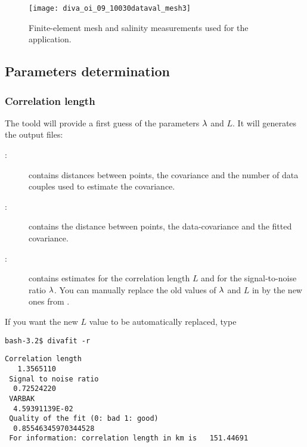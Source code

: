 \begin{figure}[h!]
\centering
\texttt{[image: diva\_oi\_09\_10030dataval\_mesh3]}
\caption{Finite-element mesh and salinity measurements used for the application.\label{fig:diva_oi_09_10030dataval_mesh3}}
\end{figure}



\subsection{Parameters determination}

\subsubsection{Correlation length}


The toold  will provide a first guess of the parameters $\lambda$ and $L$. It will generates the output files:
\begin{description}
\item[:] contains distances between points, the covariance and the number of data couples used to estimate the covariance.
\item[:] contains the distance between points, the data-covariance and the fitted covariance.
\item[:] contains estimates for the correlation length $L$ and for the signal-to-noise ratio $\lambda$. You can manually replace the old values of $\lambda$ and $L$ in  by the new ones from .
\end{description}

If you want the new $L$ value to be automatically replaced, type 

\begin{lstlisting}[style=Bash]
bash-3.2$ divafit -r
\end{lstlisting}

\begin{exfile}[H]
\begin{footnotesize}
\begin{verbatim}
Correlation length
   1.3565110
 Signal to noise ratio
  0.72524220
 VARBAK
  4.59391139E-02
 Quality of the fit (0: bad 1: good)
  0.85546345970344528
 For information: correlation length in km is   151.44691
\end{verbatim}
\end{footnotesize}
\caption{}
\end{exfile}


